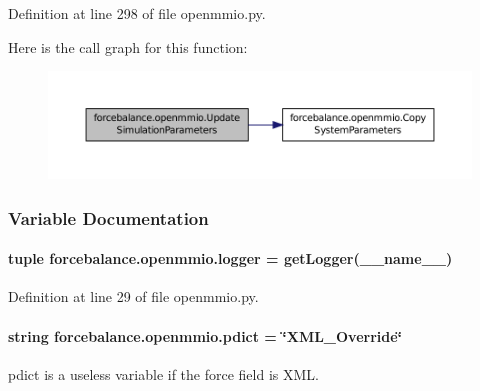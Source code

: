 Definition at line 298 of file openmmio.\-py.



Here is the call graph for this function\-:
\nopagebreak
\begin{figure}[H]
\begin{center}
\leavevmode
\includegraphics[width=350pt]{namespaceforcebalance_1_1openmmio_a9f9fc56475dbfcc94a40fef6a84ed25f_cgraph}
\end{center}
\end{figure}




\subsubsection{Variable Documentation}
\hypertarget{namespaceforcebalance_1_1openmmio_a1ec0ffb9266be80868bb69259349220d}{
\paragraph[{logger}]{\setlength{\rightskip}{0pt plus 5cm}tuple forcebalance.\-openmmio.\-logger = get\-Logger(\-\_\-\-\_\-name\-\_\-\-\_\-)}}\label{namespaceforcebalance_1_1openmmio_a1ec0ffb9266be80868bb69259349220d}


Definition at line 29 of file openmmio.\-py.

\hypertarget{namespaceforcebalance_1_1openmmio_af225f2cfdcfd96ebd1d3175c8770a850}{
\paragraph[{pdict}]{\setlength{\rightskip}{0pt plus 5cm}string forcebalance.\-openmmio.\-pdict = \char`\"{}X\-M\-L\-\_\-\-Override\char`\"{}}}\label{namespaceforcebalance_1_1openmmio_af225f2cfdcfd96ebd1d3175c8770a850}


pdict is a useless variable if the force field is X\-M\-L. 



